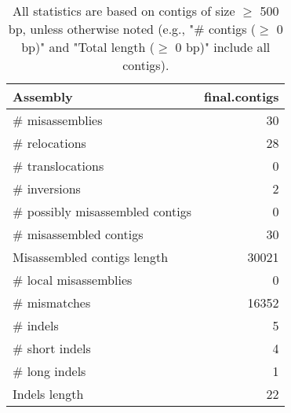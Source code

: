 \documentclass[12pt,a4paper]{article}
\begin{document}
\begin{table}[ht]
\begin{center}
\caption{All statistics are based on contigs of size $\geq$ 500 bp, unless otherwise noted (e.g., "\# contigs ($\geq$ 0 bp)" and "Total length ($\geq$ 0 bp)" include all contigs).}
\begin{tabular}{|l*{1}{|r}|}
\hline
Assembly & final.contigs \\ \hline
\# misassemblies & 30 \\ \hline
\hspace{5mm}\# relocations & 28 \\ \hline
\hspace{5mm}\# translocations & 0 \\ \hline
\hspace{5mm}\# inversions & 2 \\ \hline
\# possibly misassembled contigs & 0 \\ \hline
\# misassembled contigs & 30 \\ \hline
Misassembled contigs length & 30021 \\ \hline
\# local misassemblies & 0 \\ \hline
\# mismatches & 16352 \\ \hline
\# indels & 5 \\ \hline
\hspace{5mm}\# short indels & 4 \\ \hline
\hspace{5mm}\# long indels & 1 \\ \hline
Indels length & 22 \\ \hline
\end{tabular}
\end{center}
\end{table}
\end{document}
